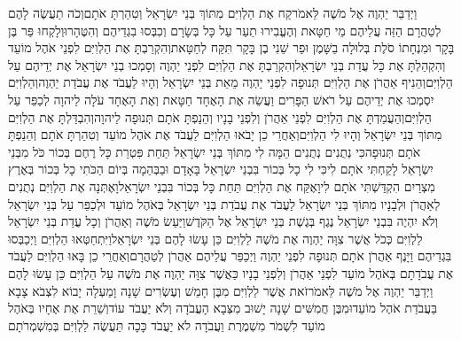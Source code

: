 \documentclass[../main/main.tex]{subfiles}
\begin{document}
\begin{multicols*}{\ncols}
וַיְדַבֵּר יַהְוֶה אֶל מֹשֶׁה לֵּאמֹר\PreVerseSpace{}קַח אֶת הַלְוִיִּם מִתּוֹךְ בְּנֵי יִשְׂרָאֵל וְטִהַרְתָּ אֹתָם\PreVerseSpace{}וְכֹה תַעֲשֶׂה לָהֶם לְטַהֲרָם הַזֵּה עֲלֵיהֶם מֵי חַטָּאת וְהֶעֱבִירוּ תַעַר עַל כָּל בְּשָׂרָם וְכִבְּסוּ בִגְדֵיהֶם וְהִטֶּהָרוּ\PreVerseSpace{}וְלָקְחוּ פַּר בֶּן בָּקָר וּמִנְחָתוֹ סֹלֶת בְּלוּלָה בַשָּׁמֶן וּפַר שֵׁנִי בֶן בָּקָר תִּקַּח לְחַטָּאת\PreVerseSpace{}וְהִקְרַבְתָּ אֶת הַלְוִיִּם לִפְנֵי אֹהֶל מוֹעֵד וְהִקְהַלְתָּ אֶת כָּל עֲדַת בְּנֵי יִשְׂרָאֵל\PreVerseSpace{}וְהִקְרַבְתָּ אֶת הַלְוִיִּם לִפְנֵי יַהְוֶה וְסָמְכוּ בְנֵי יִשְׂרָאֵל אֶת יְדֵיהֶם עַל הַלְוִיִּם\PreVerseSpace{}וְהֵנִיף אַהֲרֹן אֶת הַלְוִיִּם תְּנוּפָה לִפְנֵי יַהְוֶה מֵאֵת בְּנֵי יִשְׂרָאֵל וְהָיוּ לַעֲבֹד אֶת עֲבֹדַת יַהְוֶה\PreVerseSpace{}וְהַלְוִיִּם יִסְמְכוּ אֶת יְדֵיהֶם עַל רֹאשׁ הַפָּרִים וַעֲשֵׂה אֶת הָאֶחָד חַטָּאת וְאֶת הָאֶחָד עֹלָה לַיהוָה לְכַפֵּר עַל הַלְוִיִּם\PreVerseSpace{}וְהַעֲמַדְתָּ אֶת הַלְוִיִּם לִפְנֵי אַהֲרֹן וְלִפְנֵי בָנָיו וְהֵנַפְתָּ אֹתָם תְּנוּפָה לַיהוָה\PreVerseSpace{}וְהִבְדַּלְתָּ אֶת הַלְוִיִּם מִתּוֹךְ בְּנֵי יִשְׂרָאֵל וְהָיוּ לִי הַלְוִיִּם\PreVerseSpace{}וְאַחֲרֵי כֵן יָבֹאוּ הַלְוִיִּם לַעֲבֹד אֶת אֹהֶל מוֹעֵד וְטִהַרְתָּ אֹתָם וְהֵנַפְתָּ אֹתָם תְּנוּפָה\PreVerseSpace{}כִּי נְתֻנִים נְתֻנִים הֵמָּה לִי מִתּוֹךְ בְּנֵי יִשְׂרָאֵל תַּחַת פִּטְרַת כָּל רֶחֶם בְּכוֹר כֹּל מִבְּנֵי יִשְׂרָאֵל לָקַחְתִּי אֹתָם לִי\PreVerseSpace{}כִּי לִי כָל בְּכוֹר בִּבְנֵי יִשְׂרָאֵל בָּאָדָם וּבַבְּהֵמָה בְּיוֹם הַכֹּתִי כָל בְּכוֹר בְּאֶרֶץ מִצְרַיִם הִקְדַּשְׁתִּי אֹתָם לִי\PreVerseSpace{}וָאֶקַּח אֶת הַלְוִיִּם תַּחַת כָּל בְּכוֹר בִּבְנֵי יִשְׂרָאֵל\PreVerseSpace{}וָאֶתְּנָה אֶת הַלְוִיִּם נְתֻנִים לְאַהֲרֹן וּלְבָנָיו מִתּוֹךְ בְּנֵי יִשְׂרָאֵל לַעֲבֹד אֶת עֲבֹדַת בְּנֵי יִשְׂרָאֵל בְּאֹהֶל מוֹעֵד וּלְכַפֵּר עַל בְּנֵי יִשְׂרָאֵל וְלֹא יִהְיֶה בִּבְנֵי יִשְׂרָאֵל נֶגֶף בְּגֶשֶׁת בְּנֵי יִשְׂרָאֵל אֶל הַקֹּדֶשׁ\PreVerseSpace{}וַיַּעַשׂ מֹשֶׁה וְאַהֲרֹן וְכָל עֲדַת בְּנֵי יִשְׂרָאֵל לַלְוִיִּם כְּכֹל אֲשֶׁר צִוָּה יַהְוֶה אֶת מֹשֶׁה לַלְוִיִּם כֵּן עָשׂוּ לָהֶם בְּנֵי יִשְׂרָאֵל\PreVerseSpace{}וַיִּתְחַטְּאוּ הַלְוִיִּם וַיְכַבְּסוּ בִּגְדֵיהֶם וַיָּנֶף אַהֲרֹן אֹתָם תְּנוּפָה לִפְנֵי יַהְוֶה וַיְכַפֵּר עֲלֵיהֶם אַהֲרֹן לְטַהֲרָם\PreVerseSpace{}וְאַחֲרֵי כֵן בָּאוּ הַלְוִיִּם לַעֲבֹד אֶת עֲבֹדָתָם בְּאֹהֶל מוֹעֵד לִפְנֵי אַהֲרֹן וְלִפְנֵי בָנָיו כַּאֲשֶׁר צִוָּה יַהְוֶה אֶת מֹשֶׁה עַל הַלְוִיִּם כֵּן עָשׂוּ לָהֶם \ClosedSection{}וַיְדַבֵּר יַהְוֶה אֶל מֹשֶׁה לֵּאמֹר\PreVerseSpace{}זֹאת אֲשֶׁר לַלְוִיִּם מִבֶּן חָמֵשׁ וְעֶשְׂרִים שָׁנָה וָמַעְלָה יָבוֹא לִצְבֹא צָבָא בַּעֲבֹדַת אֹהֶל מוֹעֵד\PreVerseSpace{}וּמִבֶּן חֲמִשִּׁים שָׁנָה יָשׁוּב מִצְּבָא הָעֲבֹדָה וְלֹא יַעֲבֹד עוֹד\PreVerseSpace{}וְשֵׁרֵת אֶת אֶחָיו בְּאֹהֶל מוֹעֵד לִשְׁמֹר מִשְׁמֶרֶת וַעֲבֹדָה לֹא יַעֲבֹד כָּכָה תַּעֲשֶׂה לַלְוִיִּם בְּמִשְׁמְרֹתָם\OpenSection{}\par

\end{multicols*}
\end{document}
